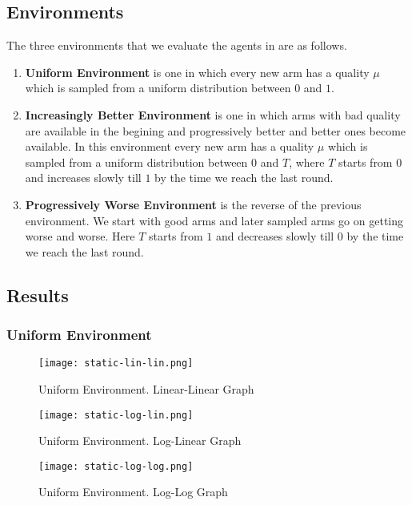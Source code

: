 \subsection{Environments}
The three environments that we evaluate the agents in are as follows.

\begin{enumerate}
    \item \textbf{Uniform Environment} is one in which every new arm has a quality $\mu$ which is sampled from a uniform distribution between $0$ and $1$.
    \item \textbf{Increasingly Better Environment} is one in which arms with bad quality are available in the begining and progressively better and better ones become available. In this environment every new arm has a quality $\mu$ which is sampled from a uniform distribution between $0$ and $T$, where $T$ starts from $0$ and increases slowly till $1$ by the time we reach the last round. 
    \item \textbf{Progressively Worse Environment} is the reverse of the previous environment. We start with good arms and later sampled arms go on getting worse and worse. Here $T$ starts from $1$ and decreases slowly till $0$ by the time we reach the last round. 
\end{enumerate}

\subsection{Results}

\subsubsection{Uniform Environment}
\begin{figure}[ht]
    \centering
    \texttt{[image: static-lin-lin.png]}
    \caption{Uniform Environment. Linear-Linear Graph}
    \label{fig:u1}
\end{figure}

\begin{figure}[ht]
    \centering
    \texttt{[image: static-log-lin.png]}
    \caption{Uniform Environment. Log-Linear Graph}
    \label{fig:u2}
\end{figure}

\begin{figure}[ht]
    \centering
    \texttt{[image: static-log-log.png]}
    \caption{Uniform Environment. Log-Log Graph}
    \label{fig:u3}
\end{figure}

